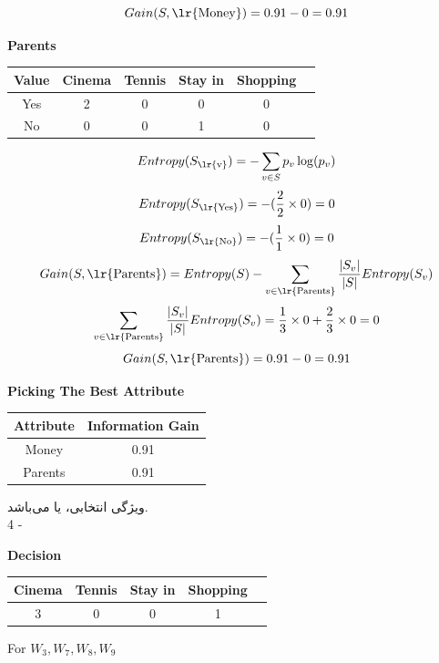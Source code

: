 \documentclass{article}
\newcommand{\tf}[1]{\text{\lr{#1}}}
\begin{document}
	\[
	Gain(S, \tf{Money}) = 0.91 - 0 = 0.91
	\]
	\newpage
	\begin{latin}
		\textbf{Parents}
		\begin{center}
			\begin{tabular}{|c|c|c|c|c|c|}
				\hline
				Value & Cinema & Tennis & Stay in & Shopping\\
				\hline
				\hline
				Yes & 2 & 0 & 0 & 0\\
				\hline
				No & 0 & 0 & 1 & 0\\
				\hline
			\end{tabular}
		\end{center}
	\end{latin}
	\vspace{5pt}
	\[
	Entropy(S_{\tf{v}}) = -\sum_{v \in S} p_v\log (p_v)
	\]
	\[
	Entropy(S_{\tf{Yes}}) = -(\frac{2}{2} \times 0) = 0
	\]
	\[
	Entropy(S_{\tf{No}}) = -(\frac{1}{1} \times 0) = 0
	\]
	\vspace{10pt}
	\[
	Gain(S, \tf{Parents}) = Entropy(S) - \sum_{v \in \tf{Parents}} \frac{| S_v |}{| S |}Entropy(S_v)
	\] 
	\[
	\sum_{v \in \tf{Parents}} \frac{| S_v |}{| S |}Entropy(S_v) = \frac{1}{3} \times 0 + \frac{2}{3} \times 0 = 0
	\]
	\[
	Gain(S, \tf{Parents}) = 0.91 - 0 = 0.91
	\]
	\begin{latin}
		\textbf{Picking The Best Attribute}
		\begin{center}
			\begin{tabular}{|c|c|}
				\hline
				Attribute & Information Gain\\
				\hline
				\hline
				Money & 0.91\\
				Parents & 0.91\\
				\hline
			\end{tabular}
		\end{center}
	\end{latin}
	ویژگی انتخابی،
	یا
	می‌باشد.\\
	4 - 
	\begin{latin}
		\textbf{Decision}
		\begin{center}
			\begin{tabular}{|c|c|c|c|c|}
				\hline
				Cinema & Tennis & Stay in & Shopping\\
				\hline
				\hline
				3 & 0 & 0 & 1\\
				\hline
			\end{tabular}
		\end{center}
		For $W_3, W_7, W_8, W_9$
	\end{latin}
	\vspace{5pt}
\end{document}
